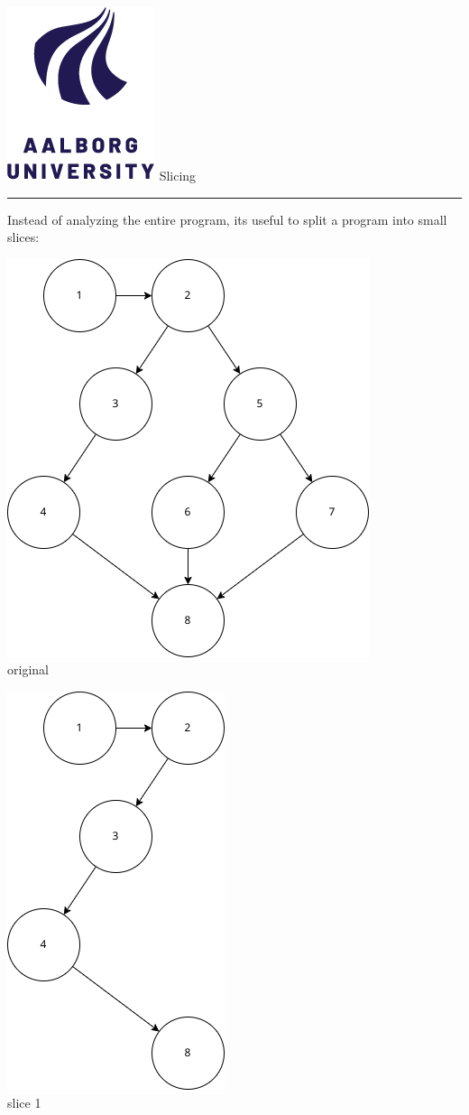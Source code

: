\documentclass[aspectratio=1610,17pt,utf8]{beamer}
\newcommand{\regularframe}[1]{\color{black}\includegraphics[width=.05\textwidth]{figures/aau.png} #1\\\hrule}
\newcommand{\rf}[1]{\regularframe{#1}}
\newcommand{\minip}[2]{\begin{minipage}{#1}#2\end{minipage}}
\begin{document}
\begin{frame}{\rf{Slicing}}
    Instead of analyzing the entire program, its useful to split a program into small slices:

    \minip{.30\textwidth}{\centering\includegraphics[height=\textwidth]{figures/du-path.drawio.png}\\\tiny original}
    \minip{.30\textwidth}{\centering\includegraphics[height=\textwidth]{figures/slice1.drawio.png}\\\tiny slice 1}

\end{frame}
\end{document}
